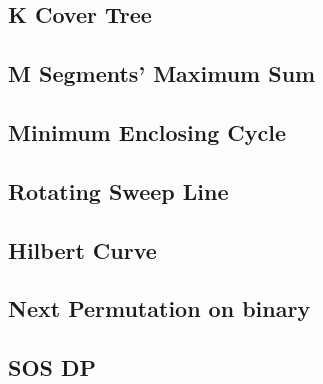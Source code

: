 \documentclass[a4paper,10pt,twocolumn,oneside]{article}
\begin{document}
\subsection{K Cover Tree}


\subsection{M Segments' Maximum Sum}


%

%

\subsection{Minimum Enclosing Cycle}


\subsection{Rotating Sweep Line}


\subsection{Hilbert Curve}


\subsection{Next Permutation on binary}


\subsection{SOS DP}

\end{document}
